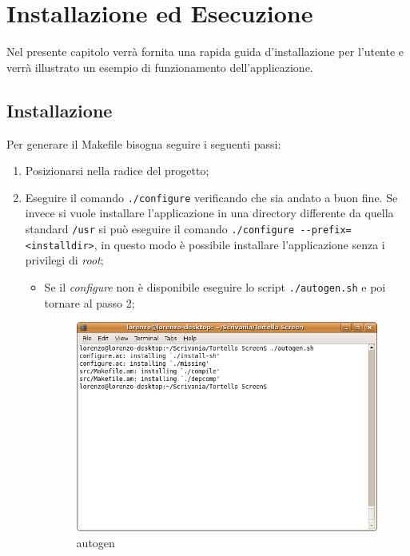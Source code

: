 \chapter{Installazione ed Esecuzione}
\lstset{basicstyle=\normalsize}
Nel presente capitolo verrà fornita una rapida guida d'installazione per l'utente e verrà illustrato un esempio di funzionamento dell'applicazione.
\section{Installazione}
Per generare il Makefile bisogna seguire i seguenti passi: 
\begin{enumerate}
\item Posizionarsi nella radice del progetto; 
\item Eseguire il comando \texttt{./configure} verificando che sia andato a buon fine. Se invece si vuole installare l'applicazione in una directory differente da quella standard \texttt{/usr} si può eseguire il comando 
\lstinline{./configure --prefix=<installdir>}, in questo modo è possibile installare l'applicazione senza i privilegi di \textit{root};
\begin{itemize}
\item Se il \textit{configure} non è disponibile eseguire lo script \texttt{./autogen.sh} e poi tornare al passo 2;
\begin{figure}[H]
\begin{center}
\includegraphics[scale=0.5]{etc/autogen.png}
\caption{autogen}
\label{autogen}
\end{center}
\end{figure}
\end{itemize}

\end{enumerate}
